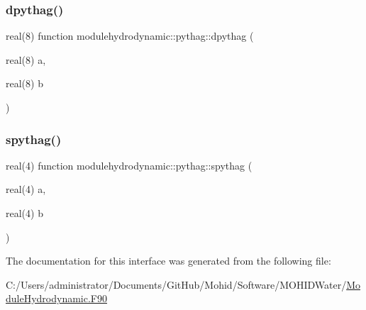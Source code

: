 \subsubsection{\texorpdfstring{dpythag()}{dpythag()}}
{\footnotesize\ttfamily real(8) function modulehydrodynamic\+::pythag\+::dpythag (\begin{DoxyParamCaption}\item[{real(8)}]{a,  }\item[{real(8)}]{b }\end{DoxyParamCaption})\hspace{0.3cm}{\ttfamily [private]}}

\mbox{\label{interfacemodulehydrodynamic_1_1pythag_a6a7341d8ee4c8f554db5092851c9f642}} 
\subsubsection{\texorpdfstring{spythag()}{spythag()}}
{\footnotesize\ttfamily real(4) function modulehydrodynamic\+::pythag\+::spythag (\begin{DoxyParamCaption}\item[{real(4)}]{a,  }\item[{real(4)}]{b }\end{DoxyParamCaption})\hspace{0.3cm}{\ttfamily [private]}}



The documentation for this interface was generated from the following file\+:\begin{DoxyCompactItemize}
\item 
C\+:/\+Users/administrator/\+Documents/\+Git\+Hub/\+Mohid/\+Software/\+M\+O\+H\+I\+D\+Water/\mbox{\hyperlink{_module_hydrodynamic_8_f90}{Module\+Hydrodynamic.\+F90}}\end{DoxyCompactItemize}
